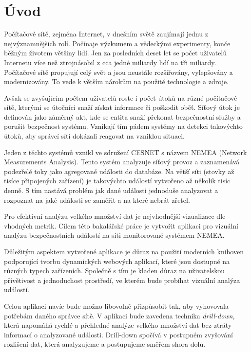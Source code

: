 
\newcommand\note[1]{{\Large \textcolor{red}{#1}}}

\chapter{Úvod}
Počítačové sítě, zejména Internet, v dnešním světě zaujímají jednu z nejvýznamnějších rolí. Počínaje výzkumem a vědeckými experimenty, konče běžným životem většiny lidí. Jen za posledních deset let se počet uživatelů Internetu více než ztrojnásobil z cca jedné miliardy lidí na tři miliardy. Počítačové sítě propujují celý svět a jsou neustále rozšiřovány, vylepšovány a modernizovány. To vede k větším nárokům na použité technologie a zdroje. 

Avšak se zvyšujícím počtem uživatelů roste i počet útoků na různé počítačové sítě, kterými se útočníci snaží získat informace či poškodit oběť. Síťový útok\cite{rfc:attack} je definován jako záměrný akt, kde se entita snaží překonat bezpečnostní služby a porušit bezpečnost systému. Vznikají tím pádem systémy na detekci takovýchto útoků, aby správcí sítí dokázali reagovat na vzniklou situaci.

Jeden z těchto systémů vznikl ve sdružení CESNET s názvem NEMEA (Network Measurements Analysis). Tento systém analyzuje síťový provoz a zaznamenává podezřelé toky jako agregované události do databáze. Na větší síti (stovky až tisíce připojených zařízení) je takovýchto událostí vytvořeno až několik tisíc denně. S tím nastává problém jak dané události jednoduše analyzovat a rozpoznat na jaké události se zaměřit a na které nebrát zřetel.

Pro efektivní analýzu velkého množství dat je nejvhodnější vizualizace dle vhodných metrik. Cílem této bakalářské práce je vytvořit aplikaci pro vizuální analýzu bezpečnostních událostí na síti monitorované systémem NEMEA. 

Důležitým aspektem vytvořené aplikace je důraz na použití moderních knihoven podporující tvorbu dynamických webových aplikací, které jsou dostupné na různých typech zařízeních. Společně s tím je kladen důraz na uživatelskou přívětivost a jednoduchost prostředí, ve kterém bude probíhat vizuální analýza událostí.

Celou aplikaci navíc bude možno libovolně přizpůsobit tak, aby vyhovovala potřebám daného správce sítě. V aplikaci bude zavedena technika {\it drill-down}, která napomáhá rychlé a přehledné analýze velkého množství dat bez ztráty informací o analyzované události. Drill-down spočívá v postupném zvyšování rozlišení dat, která analyzujeme a postupujeme směřem shora dolů.


